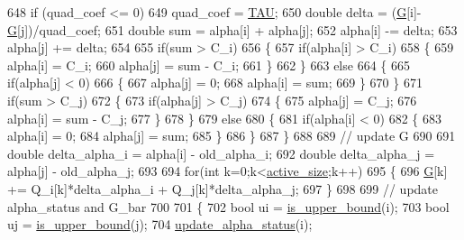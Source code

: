 \begin{DoxyCode}
648             \textcolor{keywordflow}{if} (quad\_coef <= 0)
649                 quad\_coef = \hyperlink{svm_8cpp_a3d8c9c145887af5174ba4cc6789862ad}{TAU};
650             \textcolor{keywordtype}{double} delta = (\hyperlink{class_solver_ad8ab27068f2e045591970aae1201afe9}{G}[i]-\hyperlink{class_solver_ad8ab27068f2e045591970aae1201afe9}{G}[j])/quad\_coef;
651             \textcolor{keywordtype}{double} sum = alpha[i] + alpha[j];
652             alpha[i] -= delta;
653             alpha[j] += delta;
654 
655             \textcolor{keywordflow}{if}(sum > C\_i)
656             \{
657                 \textcolor{keywordflow}{if}(alpha[i] > C\_i)
658                 \{
659                     alpha[i] = C\_i;
660                     alpha[j] = sum - C\_i;
661                 \}
662             \}
663             \textcolor{keywordflow}{else}
664             \{
665                 \textcolor{keywordflow}{if}(alpha[j] < 0)
666                 \{
667                     alpha[j] = 0;
668                     alpha[i] = sum;
669                 \}
670             \}
671             \textcolor{keywordflow}{if}(sum > C\_j)
672             \{
673                 \textcolor{keywordflow}{if}(alpha[j] > C\_j)
674                 \{
675                     alpha[j] = C\_j;
676                     alpha[i] = sum - C\_j;
677                 \}
678             \}
679             \textcolor{keywordflow}{else}
680             \{
681                 \textcolor{keywordflow}{if}(alpha[i] < 0)
682                 \{
683                     alpha[i] = 0;
684                     alpha[j] = sum;
685                 \}
686             \}
687         \}
688 
689         \textcolor{comment}{// update G}
690 
691         \textcolor{keywordtype}{double} delta\_alpha\_i = alpha[i] - old\_alpha\_i;
692         \textcolor{keywordtype}{double} delta\_alpha\_j = alpha[j] - old\_alpha\_j;
693         
694         \textcolor{keywordflow}{for}(\textcolor{keywordtype}{int} k=0;k<\hyperlink{class_solver_a06ba1b87b3749cc545e573151b7beca0}{active\_size};k++)
695         \{
696             \hyperlink{class_solver_ad8ab27068f2e045591970aae1201afe9}{G}[k] += Q\_i[k]*delta\_alpha\_i + Q\_j[k]*delta\_alpha\_j;
697         \}
698 
699         \textcolor{comment}{// update alpha\_status and G\_bar}
700 
701         \{
702             \textcolor{keywordtype}{bool} ui = \hyperlink{class_solver_a98d878b13d6f710fcaa0b16e657a37b6}{is\_upper\_bound}(i);
703             \textcolor{keywordtype}{bool} uj = \hyperlink{class_solver_a98d878b13d6f710fcaa0b16e657a37b6}{is\_upper\_bound}(j);
704             \hyperlink{class_solver_a5a978b4ff9b60b2d75e54970fd6a2c20}{update\_alpha\_status}(i);

\end{DoxyCode}
